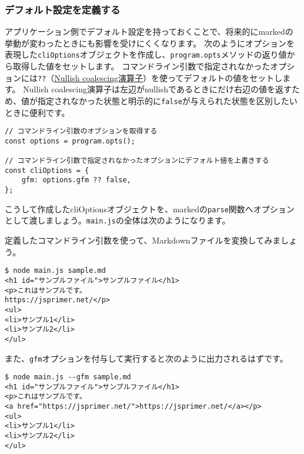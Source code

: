 \hypertarget{declare-default}{%
\subsubsection{デフォルト設定を定義する}\label{declare-default}}

アプリケーション側でデフォルト設定を持っておくことで、将来的にmarkedの挙動が変わったときにも影響を受けにくくなります。
次のようにオプションを表現した\texttt{cliOptions}オブジェクトを作成し、\texttt{program.opts}メソッドの返り値から取得した値をセットします。
コマンドライン引数で指定されなかったオプションには\texttt{??}（\href{https://jsprimer.net/basic/operator/#nullish-coalescing-operator}{Nullish coalescing演算子}）を使ってデフォルトの値をセットします。
Nullish coalescing演算子は左辺がnullishであるときにだけ右辺の値を返すため、値が指定されなかった状態と明示的に\texttt{false}が与えられた状態を区別したいときに便利です。

\begin{lstlisting}
// コマンドライン引数のオプションを取得する
const options = program.opts();

// コマンドライン引数で指定されなかったオプションにデフォルト値を上書きする
const cliOptions = {
    gfm: options.gfm ?? false,
};
\end{lstlisting}

こうして作成したcliOptionsオブジェクトを、markedの\texttt{parse}関数へオプションとして渡しましょう。\texttt{main.js}の全体は次のようになります。



定義したコマンドライン引数を使って、Markdownファイルを変換してみましょう。

\begin{lstlisting}
$ node main.js sample.md
<h1 id="サンプルファイル">サンプルファイル</h1>
<p>これはサンプルです。
https://jsprimer.net/</p>
<ul>
<li>サンプル1</li>
<li>サンプル2</li>
</ul>
\end{lstlisting}

また、\texttt{gfm}オプションを付与して実行すると次のように出力されるはずです。

\begin{lstlisting}
$ node main.js --gfm sample.md
<h1 id="サンプルファイル">サンプルファイル</h1>
<p>これはサンプルです。
<a href="https://jsprimer.net/">https://jsprimer.net/</a></p>
<ul>
<li>サンプル1</li>
<li>サンプル2</li>
</ul>
\end{lstlisting}

